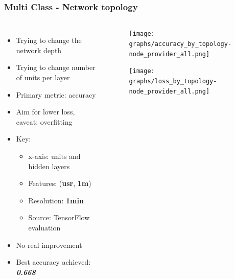 \documentclass[aspectratio=169,11pt,hyperref={colorlinks=true}]{beamer}
\begin{document}
\begin{frame}
    \frametitle{Multi Class - Network topology}
    \begin{columns}
        \begin{itemize}
            \item{Trying to change the network depth}
            \item{Trying to change number of units per layer}
            \item{Primary metric: accuracy}
            \item{Aim for lower loss, caveat: overfitting}
            \item{Key:}
            \begin{itemize}
              \item{x-axis: units and hidden layers}
              \item{Features: (\textbf{usr}, \textbf{1m})}
              \item{Resolution: \textbf{1min}}
              \item{Source: TensorFlow evaluation}
            \end{itemize}
            \item{No real improvement}
            \item{Best accuracy achieved: \emph{\textbf{0.668}}}
        \end{itemize}
        \begin{center}
        \begin{figure}
          \texttt{[image: graphs/accuracy\_by\_topology-node\_provider\_all.png]}
        \end{figure}
        \begin{figure}
          \texttt{[image: graphs/loss\_by\_topology-node\_provider\_all.png]}
        \end{figure}
      \end{center}
  \end{columns}
\end{frame}
\end{document}
